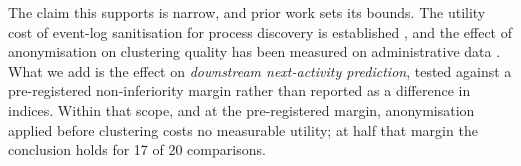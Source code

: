 The claim this supports is narrow, and prior work sets its bounds. The utility cost of event-log
sanitisation for process discovery is established \citep{fahrenkrogpetersen2019pretsa}, and the
effect of anonymisation on clustering quality has been measured on administrative data
\citep{ferrao2022utility}. What we add is the effect on \emph{downstream next-activity
prediction}, tested against a pre-registered non-inferiority margin rather than reported as a
difference in indices. Within that scope, and at the pre-registered margin, anonymisation
applied before clustering costs no measurable utility; at half that margin the conclusion holds
for 17 of 20 comparisons.
